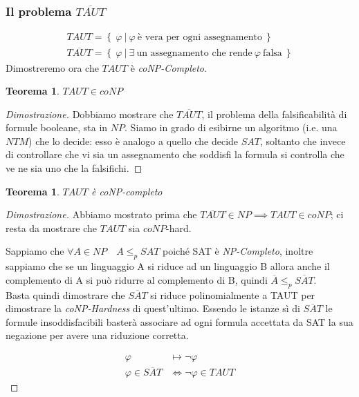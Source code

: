 \subsubsection{\texorpdfstring{Il problema $\overline{TAUT}$}{Il complemento di TAUT}}
\begin{gather*}
	TAUT = \left\{ \ \varphi \ | \ \varphi \ \text{è vera per ogni assegnamento} \ \right\} \\
	\overline{TAUT} = \left\{ \ \varphi \ | \ \exists \ \text{un assegnamento che rende} \ \varphi \ \text{falsa} \ \right\}
\end{gather*}
Dimostreremo ora che $TAUT$ è \emph{coNP-Completo}.
\newtheorem*{tautcoNP}{Teorema}
\begin{tautcoNP}
	$TAUT \in coNP$
\end{tautcoNP}
\begin{proof}[Dimostrazione]
Dobbiamo mostrare che $\overline{TAUT}$, il problema della falsificabilità di formule booleane, sta in $NP$. Siamo in grado di esibirne un algoritmo (i.e. una $NTM$) che lo decide: esso è analogo a quello che decide $SAT$, soltanto che invece di controllare che vi sia un assegnamento che soddisfi la formula si controlla che ve ne sia uno che la falsifichi. 
\end{proof}

\newtheorem*{tautcoNPhard}{Teorema}
\begin{tautcoNPhard}
	$TAUT$ è coNP-completo
\end{tautcoNPhard}
\begin{proof}[Dimostrazione]
Abbiamo mostrato prima che $\overline{TAUT} \in NP \implies TAUT \in coNP$; ci resta da mostrare che $TAUT$ sia $coNP$-hard.

Sappiamo che $\forall A \in NP \quad A \leq_{p} SAT$ poiché SAT è \emph{NP-Completo}, inoltre sappiamo che se un linguaggio A si riduce ad un linguaggio B allora anche il complemento di A si può ridurre al complemento di B, quindi $\overline{A} \leq_{p} \overline{SAT}$. \\
Basta quindi dimostrare che $\overline{SAT}$ si riduce polinomialmente a TAUT per dimostrare la \emph{coNP-Hardness} di quest'ultimo. Essendo le istanze sì di $\overline{SAT}$ le formule insoddisfacibili basterà associare ad ogni formula accettata da SAT la sua negazione per avere una riduzione corretta.

\begin{align*}
	\varphi &\mapsto \neg \varphi \\
	\varphi \in \overline{SAT} &\iff \neg \varphi \in TAUT
\end{align*}

\end{proof}

